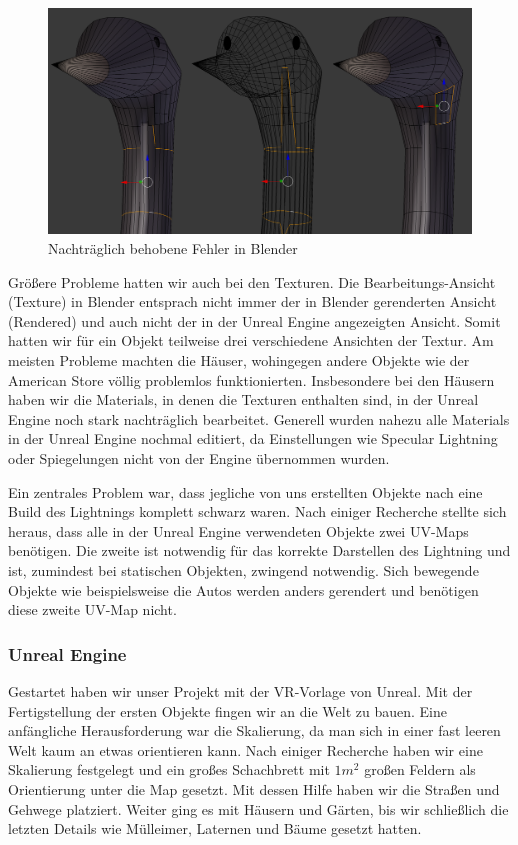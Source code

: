 \documentclass{Bericht}
\begin{document}
		\begin{figure}[!htbp] %
			\centering
			\includegraphics[height=\textheight, width=\linewidth, keepaspectratio, angle=0]{../Bilder/Heron_Problem.png} %
			\caption{Nachträglich behobene Fehler in Blender}
			\label{img:heron-error}
		\end{figure}
			
			Größere Probleme hatten wir auch bei den Texturen. Die Bearbeitungs-Ansicht (Texture) in Blender entsprach nicht immer der in Blender gerenderten Ansicht (Rendered) und auch nicht der in der Unreal Engine angezeigten Ansicht. Somit hatten wir für ein Objekt teilweise drei verschiedene Ansichten der Textur. Am meisten Probleme machten die Häuser, wohingegen andere Objekte wie der American Store völlig problemlos funktionierten. Insbesondere bei den Häusern haben wir die Materials, in denen die Texturen enthalten sind, in der Unreal Engine noch stark nachträglich bearbeitet.
			Generell wurden nahezu alle Materials in der Unreal Engine nochmal editiert, da Einstellungen wie Specular Lightning oder Spiegelungen nicht von der Engine übernommen wurden.
			
			Ein zentrales Problem war, dass jegliche von uns erstellten Objekte nach eine Build des Lightnings komplett schwarz waren. Nach einiger Recherche stellte sich heraus, dass alle in der Unreal Engine verwendeten Objekte zwei UV-Maps benötigen. Die zweite ist notwendig für das korrekte Darstellen des Lightning und ist, zumindest bei statischen Objekten, zwingend notwendig. Sich bewegende Objekte wie beispielsweise die Autos werden anders gerendert und benötigen diese zweite UV-Map nicht. 
		
		\subsubsection{Unreal Engine}
			Gestartet haben wir unser Projekt mit der VR-Vorlage von Unreal. Mit der Fertigstellung der ersten Objekte fingen wir an die Welt zu bauen. Eine anfängliche Herausforderung war die Skalierung, da man sich in einer fast leeren Welt kaum an etwas orientieren kann. Nach einiger Recherche haben wir eine Skalierung festgelegt und ein großes Schachbrett mit $1m^{2}$ großen Feldern als Orientierung unter die Map gesetzt. Mit dessen Hilfe haben wir die Straßen und Gehwege platziert. Weiter ging es mit Häusern und Gärten, bis wir schließlich die letzten Details wie Mülleimer, Laternen und Bäume gesetzt hatten. 
			
\end{document}
